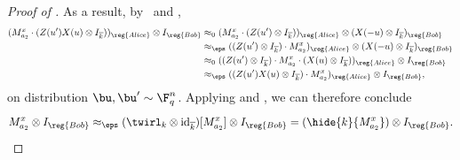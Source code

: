 \begin{proof}[Proof of ]
As a result, by~ and ,
\begin{align*}
(M_{a_2}^x \cdot (Z(u') X(u)\otimes I_{\overline{k}}))_{\reg{Alice}} \otimes I_{\reg{Bob}}
& \approx_{0}(M_{a_2}^x \cdot (Z(u')\otimes I_{\overline{k}}))_{\reg{Alice}} \otimes (X(-u)\otimes I_{\overline{k}})_{\reg{Bob}}\\
& \approx_{\eps}((Z(u')\otimes I_{\overline{k}}) \cdot M_{a_2}^x)_{\reg{Alice}} \otimes (X(-u)\otimes I_{\overline{k}})_{\reg{Bob}}\\
& \approx_{0}((Z(u')\otimes I_{\overline{k}}) \cdot M_{a_2}^x \cdot (X(u) \otimes I_{\overline{k}}))_{\reg{Alice}} \otimes I_{\reg{Bob}}\\
& \approx_{\eps}((Z(u') X(u)\otimes I_{\overline{k}}) \cdot M_{a_2}^x)_{\reg{Alice}} \otimes I_{\reg{Bob}},
\end{align*}
on distribution $\bu, \bu' \sim \F_q^n$.
Applying  and ,
we can therefore conclude
\begin{equation*}
M_{a_2}^x \otimes I_{\reg{Bob}}
\approx_{\eps} (\twirl_k \otimes \mathrm{id}_{\overline{k}})[M_{a_2}^x] \otimes I_{\reg{Bob}}
= (\hide{k}{M_{a_2}^x}) \otimes I_{\reg{Bob}}.\qedhere
\end{equation*}
\end{proof}





